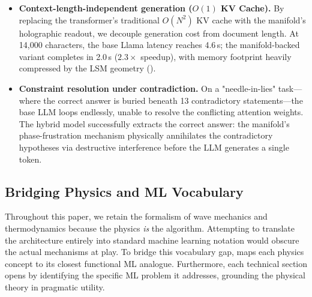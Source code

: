 \documentclass[11pt,a4paper]{article}
\begin{document}
\begin{itemize}[nosep]
  \item \textbf{Context-length-independent generation ($O(1)$ KV Cache).} By replacing the transformer's traditional $O(N^2)$ KV cache with the manifold's holographic readout, we decouple generation cost from document length. At 14,000 characters, the base Llama latency reaches 4.6\,s; the manifold-backed variant completes in 2.0\,s ($2.3\times$ speedup), with memory footprint heavily compressed by the LSM geometry ().
  \item \textbf{Constraint resolution under contradiction.} On a "needle-in-lies" task—where the correct answer is buried beneath 13 contradictory statements—the base LLM loops endlessly, unable to resolve the conflicting attention weights. The hybrid model successfully extracts the correct answer: the manifold's phase-frustration mechanism physically annihilates the contradictory hypotheses via destructive interference before the LLM generates a single token.
\end{itemize}

\subsection{Bridging Physics and ML Vocabulary}
\label{sec:vocabulary}
Throughout this paper, we retain the formalism of wave mechanics and thermodynamics because the physics \emph{is} the algorithm. Attempting to translate the architecture entirely into standard machine learning notation would obscure the actual mechanisms at play. To bridge this vocabulary gap,  maps each physics concept to its closest functional ML analogue. Furthermore, each technical section opens by identifying the specific ML problem it addresses, grounding the physical theory in pragmatic utility.
\end{document}
